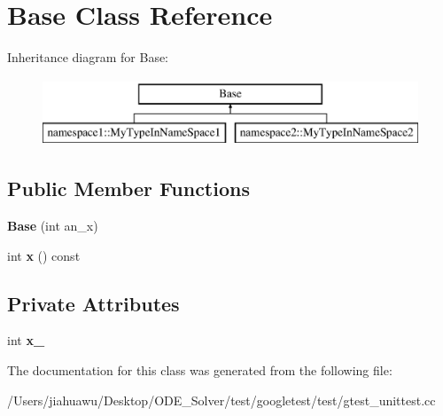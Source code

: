 \hypertarget{class_base}{}\section{Base Class Reference}
\label{class_base}
Inheritance diagram for Base\+:\begin{figure}[H]
\begin{center}
\leavevmode
\includegraphics[height=2.000000cm]{class_base}
\end{center}
\end{figure}
\subsection*{Public Member Functions}
\begin{DoxyCompactItemize}
\item 
\mbox{\label{class_base_a1d5f3fb92f8cbc687705785bdc6abd18}} 
{\bfseries Base} (int an\+\_\+x)
\item 
\mbox{\label{class_base_a779fd2b157ebd763b15383d96047e07c}} 
int {\bfseries x} () const
\end{DoxyCompactItemize}
\subsection*{Private Attributes}
\begin{DoxyCompactItemize}
\item 
\mbox{\label{class_base_a52a6455160a570c261fe257b5d785707}} 
int {\bfseries x\+\_\+}
\end{DoxyCompactItemize}


The documentation for this class was generated from the following file\+:\begin{DoxyCompactItemize}
\item 
/\+Users/jiahuawu/\+Desktop/\+O\+D\+E\+\_\+\+Solver/test/googletest/test/gtest\+\_\+unittest.\+cc\end{DoxyCompactItemize}
